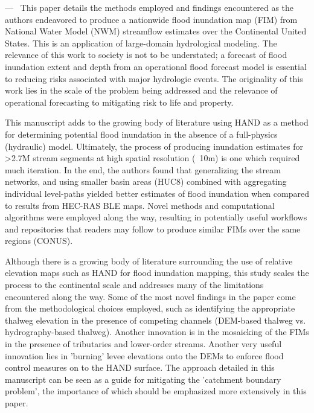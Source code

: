 \documentclass[11pt]{article}
\newcounter{reviewer}
\newcounter{point}[reviewer]
\renewcommand{\thepoint}{P\,\thereviewer.\arabic{point}}
\newenvironment{point}
   {\refstepcounter{point} \bigskip \noindent {\textbf{Reviewer~Point~\thepoint} } ---\ }
   {\par }
\begin{document}
\begin{point}
This paper details the methods employed and findings encountered as the authors endeavored to produce a nationwide flood inundation map (FIM) from National Water Model (NWM) streamflow estimates over the Continental United States.
This is an application of large-domain hydrological modeling.
The relevance of this work to society is not to be understated; a forecast of flood inundation extent and depth from an operational flood forecast model is essential to reducing risks associated with major hydrologic events.
The originality of this work lies in the scale of the problem being addressed and the relevance of operational forecasting to mitigating risk to life and property.

This manuscript adds to the growing body of literature using HAND as a method for determining potential flood inundation in the absence of a full-physics (hydraulic) model.
Ultimately, the process of producing inundation estimates for >2.7M stream segments at high spatial resolution (~10m) is one which required much iteration.
In the end, the authors found that generalizing the stream networks, and using smaller basin areas (HUC8) combined with aggregating individual level-paths yielded better estimates of flood inundation when compared to results from HEC-RAS BLE maps.
Novel methods and computational algorithms were employed along the way, resulting in potentially useful workflows and repositories that readers may follow to produce similar FIMs over the same regions (CONUS).

Although there is a growing body of literature surrounding the use of relative elevation maps such as HAND for flood inundation mapping, this study scales the process to the continental scale and addresses many of the limitations encountered along the way.
Some of the most novel findings in the paper come from the methodological choices employed, such as identifying the appropriate thalweg elevation in the presence of competing channels (DEM-based thalweg vs. hydrography-based thalweg).
Another innovation is in the mosaicking of the FIMs in the presence of tributaries and lower-order streams.
Another very useful innovation lies in 'burning' levee elevations onto the DEMs to enforce flood control measures on to the HAND surface.
The approach detailed in this manuscript can be seen as a guide for mitigating the 'catchment boundary problem', the importance of which should be emphasized more extensively in this paper.


\end{point}
\end{document}
